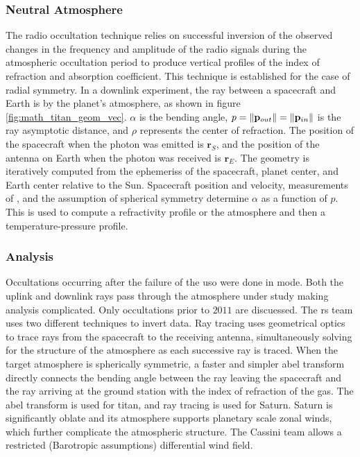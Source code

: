 \documentclass{article}
\begin{document}
            \subsubsection{\footnotesize Neutral Atmosphere}
            The radio \gls{occultation} technique relies on successful inversion of the observed changes in the \gls{frequency} and \gls{amplitude} of the radio signals during the atmospheric \gls{occultation} period to produce vertical profiles of the \gls{index of refraction} and \gls{absorption coefficient}. This technique is established for the case of radial symmetry. In a  \gls{downlink} experiment, the ray between a spacecraft and Earth is  by the planet's \gls{atmosphere}, as shown in figure \ref{fig:math_titan_geom_vec}. $\alpha$ is the \gls{bending angle}, $p=\lVert\mathbf{p}_{out}\rVert=\lVert\mathbf{p}_{in}\rVert$ is the ray asymptotic distance, and $\rho$ represents the center of refraction. The position of the spacecraft when the photon was emitted is $\mathbf{r}_{S}$, and the position of the antenna on Earth when the photon was received is $\mathbf{r}_{E}$. The geometry is iteratively computed from the \glspl{ephemeris} of the spacecraft, planet center, and Earth center relative to the Sun. Spacecraft position and velocity, measurements of , and the assumption of spherical symmetry determine $\alpha$ as a function of $p$. This is used to compute a refractivity profile or the \gls{atmosphere} and then a \gls{temperature-pressure profile}.
            \subsubsection{\footnotesize Analysis}
            Occultations occurring after the failure of the \gls{uso} were done in  mode. Both the \gls{uplink} and \gls{downlink} rays pass through the \gls{atmosphere} under study making analysis complicated. Only \glspl{occultation} prior to $2011$ are discuessed. The \gls{rs} team uses two different techniques to invert  data. Ray tracing uses geometrical optics to trace rays from the spacecraft to the receiving antenna, simultaneously solving for the structure of the \gls{atmosphere} as each successive ray is traced. When the target \gls{atmosphere} is spherically symmetric, a faster and simpler \gls{abel transform} directly connects the \gls{bending angle} between the ray leaving the spacecraft and the ray arriving at the ground station with the index of refraction of the gas. The \gls{abel transform} is used for \gls{titan}, and ray tracing is used for Saturn. Saturn is significantly oblate and its atmosphere supports planetary scale zonal winds, which further complicate the atmospheric structure. The Cassini team allows a restricted (Barotropic assumptions) differential wind field.
\end{document}
